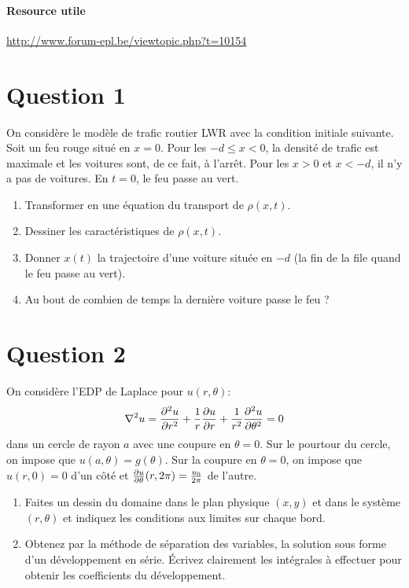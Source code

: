 


\paragraph{Resource utile}
\url{http://www.forum-epl.be/viewtopic.php?t=10154}

\section*{Question 1}
On considère le modèle de trafic routier LWR
avec la condition initiale suivante.
Soit un feu rouge situé en $x = 0$.
Pour les $-d \leq x < 0$,
la densité de trafic est maximale et les voitures sont,
de ce fait, à l'arrêt.
Pour les $x > 0$ et $x < -d$,
il n'y a pas de voitures.
En $t = 0$, le feu passe au vert.
\begin{enumerate}
  \item Transformer en une équation du transport de $\rho(x,t)$.
  \item Dessiner les caractéristiques de $\rho(x,t)$.
  \item Donner $x(t)$ la trajectoire d'une voiture située en $-d$
    (la fin de la file quand le feu passe au vert).
  \item Au bout de combien de temps la dernière voiture passe le feu ?
\end{enumerate}

\solution{
}

\section*{Question 2}
On considère l'EDP de Laplace pour $u(r,\theta)$:
$$\nabla ^2u =
\frac{\partial^2 u}{\partial r^2} +\frac{1}{r} \frac{\partial u}{\partial r} + \frac{1}{r^2}\frac{\partial^2 u}{\partial \theta^2} = 0$$
dans un cercle de rayon $a$ avec une coupure en $\theta = 0$.
Sur le pourtour du cercle,
on impose que $u(a, \theta) = g(\theta)$.
Sur la coupure en $\theta = 0$,
on impose que $u(r, 0) = 0$ d'un côté et
$\frac{\partial u}{\partial \theta}(r, 2\pi) = \frac{u_0}{2\pi}$ de l'autre.
\begin{enumerate}
  \item Faites un dessin du domaine dans le plan physique $(x,y)$ et dans le
    système $(r,\theta)$ et
    indiquez les conditions aux limites sur chaque bord.
  \item Obtenez par la méthode de séparation des variables,
    la solution sous forme d'un développement en série.
    Écrivez clairement les intégrales à effectuer
    pour obtenir les coefficients du développement.
\end{enumerate}

